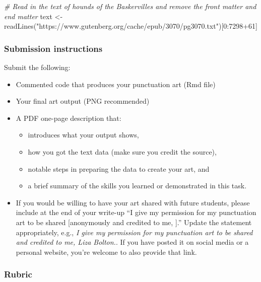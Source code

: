 \documentclass[
  openany]{book}
\newenvironment{Shaded}{\begin{snugshade}}{\end{snugshade}}
\newcommand{\CommentTok}[1]{\textcolor[rgb]{0.56,0.35,0.01}{\textit{#1}}}
\newcommand{\DecValTok}[1]{\textcolor[rgb]{0.00,0.00,0.81}{#1}}
\newcommand{\FunctionTok}[1]{\textcolor[rgb]{0.00,0.00,0.00}{#1}}
\newcommand{\NormalTok}[1]{#1}
\newcommand{\OtherTok}[1]{\textcolor[rgb]{0.56,0.35,0.01}{#1}}
\newcommand{\SpecialCharTok}[1]{\textcolor[rgb]{0.00,0.00,0.00}{#1}}
\newcommand{\StringTok}[1]{\textcolor[rgb]{0.31,0.60,0.02}{#1}}
\providecommand{\tightlist}{%
  \setlength{\itemsep}{0pt}\setlength{\parskip}{0pt}}
\begin{document}
\begin{Shaded}
\begin{Highlighting}[]
\CommentTok{\# Read in the text of hounds of the Baskervilles and remove the front matter and end matter}
\NormalTok{text }\OtherTok{\textless{}{-}} \FunctionTok{readLines}\NormalTok{(}\StringTok{"https://www.gutenberg.org/cache/epub/3070/pg3070.txt"}\NormalTok{)[}\DecValTok{0}\SpecialCharTok{:}\DecValTok{7298}\SpecialCharTok{+}\DecValTok{61}\NormalTok{]}
\end{Highlighting}
\end{Shaded}

\hypertarget{submission-instructions-2}{%
\subsubsection{Submission instructions}\label{submission-instructions-2}}

Submit the following:

\begin{itemize}
\tightlist
\item
  Commented code that produces your punctuation art (Rmd file)
\item
  Your final art output (PNG recommended)
\item
  A PDF one-page description that:

  \begin{itemize}
  \tightlist
  \item
    introduces what your output shows,
  \item
    how you got the text data (make sure you credit the source),
  \item
    notable steps in preparing the data to create your art, and
  \item
    a brief summary of the skills you learned or demonstrated in this task.
  \end{itemize}
\item
  If you would be willing to have your art shared with future students, please include at the end of your write-up ``I give my permission for my punctuation art to be shared {[}anonymously \textbar{} and credited to me, {]}.'' Update the statement appropriately, e.g., \emph{I give my permission for my punctuation art to be shared and credited to me, Liza Bolton.}. If you have posted it on social media or a personal website, you're welcome to also provide that link.
\end{itemize}

\hypertarget{rubric-4}{%
\subsubsection{Rubric}\label{rubric-4}}
\end{document}
